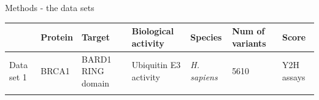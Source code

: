 \documentclass[ignorenonframetext,]{beamer}
\begin{document}
\begin{frame}{Methods - the data sets}
\protect\hypertarget{methods---the-data-sets}{}

\begin{longtable}[]{@{}lllllll@{}}
\toprule
\begin{minipage}[b]{0.05\columnwidth}\raggedright
\strut
\end{minipage} & \begin{minipage}[b]{0.04\columnwidth}\raggedright
Protein\strut
\end{minipage} & \begin{minipage}[b]{0.14\columnwidth}\raggedright
Target\strut
\end{minipage} & \begin{minipage}[b]{0.12\columnwidth}\raggedright
Biological activity\strut
\end{minipage} & \begin{minipage}[b]{0.08\columnwidth}\raggedright
Species\strut
\end{minipage} & \begin{minipage}[b]{0.08\columnwidth}\raggedright
Num of variants\strut
\end{minipage} & \begin{minipage}[b]{0.30\columnwidth}\raggedright
Score\strut
\end{minipage}\tabularnewline
\midrule
\endhead
\begin{minipage}[t]{0.05\columnwidth}\raggedright
Data set 1\strut
\end{minipage} & \begin{minipage}[t]{0.04\columnwidth}\raggedright
BRCA1\strut
\end{minipage} & \begin{minipage}[t]{0.14\columnwidth}\raggedright
BARD1 RING domain\strut
\end{minipage} & \begin{minipage}[t]{0.12\columnwidth}\raggedright
Ubiquitin E3 activity\strut
\end{minipage} & \begin{minipage}[t]{0.08\columnwidth}\raggedright
\emph{H. sapiens}\strut
\end{minipage} & \begin{minipage}[t]{0.08\columnwidth}\raggedright
5610\strut
\end{minipage} & \begin{minipage}[t]{0.30\columnwidth}\raggedright
Y2H assays\strut
\end{minipage}\tabularnewline
\begin{minipage}[t]{0.05\columnwidth}\raggedright

\end{minipage}
\end{longtable}
\end{frame}
\end{document}
